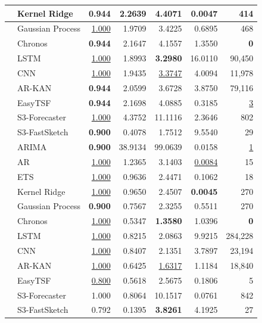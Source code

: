 \begin{table}[p]
\begin{tabular}{|>{\centering\arraybackslash}p{1.15cm}|>{\raggedright\arraybackslash}p{2.25cm}|r|r|r|r|r|}
\cline{2-7}
 & Kernel Ridge & \textbf{0.944} & 2.2639 & 4.4071 & \textbf{0.0047} & 414 \\
\cline{2-7}
 & Gaussian Process & \underline{1.000} & 1.9709 & 3.4225 & 0.6895 & 468 \\
\cline{2-7}
 & Chronos & \textbf{0.944} & 2.1647 & 4.1557 & 1.3550 & \textbf{0} \\
\cline{2-7}
 & LSTM & \underline{1.000} & 1.8993 & \textbf{3.2980} & 16.0110 & 90,450 \\
\cline{2-7}
 & CNN & \underline{1.000} & 1.9435 & \underline{3.3747} & 4.0094 & 11,978 \\
\cline{2-7}
 & AR-KAN & \textbf{0.944} & 2.0599 & 3.6728 & 3.8750 & 79,116 \\
\cline{2-7}
 & EasyTSF & \textbf{0.944} & 2.1698 & 4.0885 & 0.3185 & \underline{3} \\
\hline
\multirow{12}{=}{\centering ICMD} & S3-Forecaster & \underline{1.000} & 4.3752 & 11.1116 & 2.3646 & 802 \\
\cline{2-7}
 & S3-FastSketch & \textbf{0.900} & 0.4078 & 1.7512 & 9.5540 & 29 \\
\cline{2-7}
 & ARIMA & \textbf{0.900} & 38.9134 & 99.0639 & 0.0158 & \underline{1} \\
\cline{2-7}
 & AR & \underline{1.000} & 1.2365 & 3.1403 & \underline{0.0084} & 15 \\
\cline{2-7}
 & ETS & \underline{1.000} & 0.9636 & 2.4471 & 0.1062 & 18 \\
\cline{2-7}
 & Kernel Ridge & \underline{1.000} & 0.9650 & 2.4507 & \textbf{0.0045} & 270 \\
\cline{2-7}
 & Gaussian Process & \textbf{0.900} & 0.7567 & 2.3255 & 0.5511 & 270 \\
\cline{2-7}
 & Chronos & \underline{1.000} & 0.5347 & \textbf{1.3580} & 1.0396 & \textbf{0} \\
\cline{2-7}
 & LSTM & \underline{1.000} & 0.8215 & 2.0863 & 9.9215 & 284,228 \\
\cline{2-7}
 & CNN & \underline{1.000} & 0.8407 & 2.1351 & 3.7897 & 23,194 \\
\cline{2-7}
 & AR-KAN & \underline{1.000} & 0.6425 & \underline{1.6317} & 1.1184 & 18,840 \\
\cline{2-7}
 & EasyTSF & \underline{0.800} & 0.5618 & 2.5675 & 0.1806 & 5 \\
\hline
\multirow{12}{=}{\centering Tourism} & S3-Forecaster & 1.000 & 0.8064 & 10.1517 & 0.0761 & 842 \\
\cline{2-7}
 & S3-FastSketch & 0.792 & 0.1395 & \textbf{3.8261} & 4.1925 & 27 \\

\end{tabular}
\end{table}

